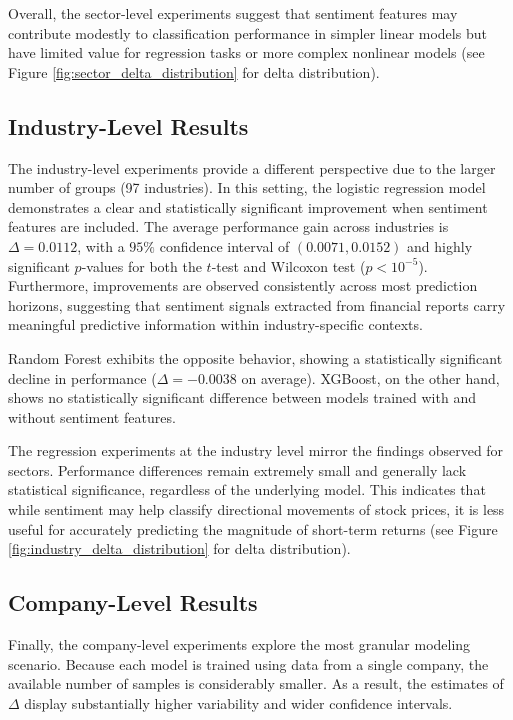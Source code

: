 Overall, the sector-level experiments suggest that sentiment features may contribute modestly to classification performance in simpler linear models but have limited value for regression tasks or more complex nonlinear models (see Figure \ref{fig:sector_delta_distribution} for delta distribution).

\subsection{Industry-Level Results}

The industry-level experiments provide a different perspective due to the larger number of groups (97 industries). In this setting, the logistic regression model demonstrates a clear and statistically significant improvement when sentiment features are included. The average performance gain across industries is $\Delta = 0.0112$, with a $95\%$ confidence interval of $(0.0071, 0.0152)$ and highly significant $p$-values for both the $t$-test and Wilcoxon test ($p < 10^{-5}$). Furthermore, improvements are observed consistently across most prediction horizons, suggesting that sentiment signals extracted from financial reports carry meaningful predictive information within industry-specific contexts.

Random Forest exhibits the opposite behavior, showing a statistically significant decline in performance ($\Delta = -0.0038$ on average). XGBoost, on the other hand, shows no statistically significant difference between models trained with and without sentiment features.

The regression experiments at the industry level mirror the findings observed for sectors. Performance differences remain extremely small and generally lack statistical significance, regardless of the underlying model. This indicates that while sentiment may help classify directional movements of stock prices, it is less useful for accurately predicting the magnitude of short-term returns (see Figure \ref{fig:industry_delta_distribution} for delta distribution).

\subsection{Company-Level Results}

Finally, the company-level experiments explore the most granular modeling scenario. Because each model is trained using data from a single company, the available number of samples is considerably smaller. As a result, the estimates of $\Delta$ display substantially higher variability and wider confidence intervals.

